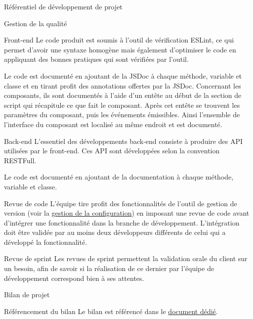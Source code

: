 \documentclass[]{article}
\begin{document}
{\begin{section}{\label{sec:Référentiel de développement de projet}Référentiel de développement de projet}
     \begin{subsection}{\label{sec:Gestion de la qualité}Gestion de la qualité}
         \begin{subsubsection}{\label{sec:Front-end}Front-end}
             Le code produit est soumis à l’outil de vérification ESLint, ce qui permet d’avoir une syntaxe homogène mais également d’optimiser le code en appliquant des bonnes pratiques qui sont vérifiées par l’outil.

             Le code est documenté en ajoutant de la JSDoc à chaque méthode, variable et classe et en tirant profit des annotations offertes par la JSDoc. Concernant les composants, ils sont documentés à l’aide d’un entête au début de la section de script qui récapitule ce que fait le composant. Après cet entête se trouvent les paramètres du composant, puis les événements émissibles. Ainsi l’ensemble de l’interface du composant est localisé au même endroit et est documenté.
         \end{subsubsection}

         \begin{subsubsection}{\label{sec:Back-end}Back-end}
             L’essentiel des développements back-end consiste à produire des API utilisées par le front-end. Ces API sont développées selon la convention RESTFull.

             Le code est documenté en ajoutant de la documentation à chaque méthode, variable et classe.
         \end{subsubsection}

         \begin{subsubsection}{\label{sec:Revue de code}Revue de code}
             L’équipe tire profit des fonctionnalités de l’outil de gestion de version (voir la \hyperref[sec:Gestion de la configuration]{gestion de la configuration}) en imposant une revue de code avant d’intégrer une fonctionnalité dans la branche de développement. L’intégration doit être validée par au moins deux développeurs différents de celui qui a développé la fonctionnalité.
         \end{subsubsection}

         \begin{subsubsection}{\label{sec:Revue de sprint}Revue de sprint}
             Les revues de sprint permettent la validation orale du client sur un besoin, afin de savoir si la réalisation de ce dernier par l’équipe de développement correspond bien à ses attentes.
         \end{subsubsection}
     \end{subsection}
    \end{section}

    \begin{section}{\label{sec:Bilan de projet}Bilan de projet}
     \begin{subsection}{\label{sec:Référencement du bilan}Référencement du bilan}
         Le bilan est référencé dans le \href{documents/Bilan_de_projet.pdf}{document dédié}.
     \end{subsection}
    \end{section}
}
\end{document}
